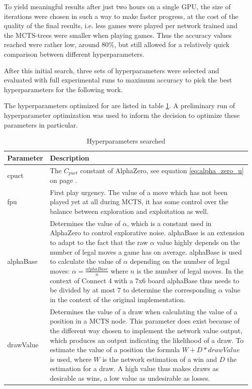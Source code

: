 \documentclass[12pt,onecolumn,oneside,titlepage]{article}
\begin{document}
To yield meaningful results after just two hours on a single GPU,
the size of iterations were chosen in such a way to make faster progress, at the cost of the quality of the final results, i.e. less games were played per network trained and the MCTS-trees were smaller when playing games. Thus the accuracy values reached were rather low, around $80\%$,
but still allowed for a relatively quick comparison between different hyperparameters. 

After this initial search, three sets of hyperparameters were selected and evaluated with full experimental runs to maximum accuracy to pick the best hyperparameters for the following work.

The hyperparameters optimized for are listed in table \ref{t:hyperparameters}. A preliminary run of hyperparameter optimization was used to inform the decision to optimize these parameters in particular.

\begin{table}[H]
  \centering
    \begin{tabularx}{\textwidth}{lX}
    \toprule
    Parameter     & Description \\
    \midrule
    cpuct          & The $C_{puct}$ constant of AlphaZero, see equation \ref{eq:alpha_zero_u} on page \pageref{eq:alpha_zero_u}. \\
    \hline
    fpu          & First play urgency. The value of a move which has not been played yet at all during MCTS, it has some control over the balance between exploration and exploitation as well. \\
    \hline
    alphaBase          & Determines the value of $\alpha$, which is a constant used in AlphaZero to control explorative noise. alphaBase is an extension to adapt to the fact that the raw $\alpha$ value highly depends on the number of legal moves a game has on average.
      alphaBase is used to calculate the value of $\alpha$ depending on the number of legal moves: $\alpha = \frac{alphaBase}{n}$ where $n$ is the number of legal moves. 
      In the context of Connect 4 with a 7x6 board alphaBase thus needs to be divided by at most $7$ to determine the corresponding $\alpha$ value in the context of the original implementation. \\
      \hline 
    drawValue & Determines the value of a draw when calculating the value of a position in a MCTS node. This parameter does exist because of the different way chosen to implement the network value output, which produces
  an output indicating the likelihood of a draw. To estimate the value of a position the formula $W + D*drawValue$ is used, where $W$ is the network estimation of a win and $D$ the estimation for a draw. A high value thus makes draws
  as desirable as wins, a low value as undesirable as losses.\\
    \bottomrule
    \end{tabularx}%
  \label{tab:addlabel}%
  \caption{Hyperparameters searched}
  \label{t:hyperparameters}
\end{table}
\end{document}
